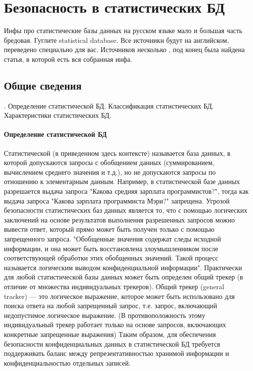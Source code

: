 \section{Безопасность в статистических БД}

Инфы про статистические базы данных на русском языке мало и большая часть бредовая. Гуглите statistical database. Все источники будут на английском, переведено специально для вас. Источников несколько \cite{ComputerSecurity2008} \cite{IntroBD2014}, под конец была найдена статья, \cite{SDB1989} в которой есть вся собранная инфа.

\subsection{Общие сведения}.
Определение статистической БД. Классификация статистических БД. Характеристики статистических БД.

\paragraph{Определение статистической БД}
Статистической (в приведенном здесь контексте) называется база данных, в которой допускаются запросы с обобщением данных (суммированием, вычислением среднего значения и т.д.), но не допускаются запросы по отношению к элементарным данным. Например, в статистической базе данных разрешается выдача запроса "Какова средняя зарплата программистов?", тогда как выдача запроса "Какова зарплата программиста Мэри?" запрещена.
Угрозой безопасности статистических баз данных является то, что с помощью логических заключений на основе результатов выполнения разрешенных запросов можно вывести ответ, который прямо может быть получен только с помощью запрещенного запроса. "Обобщенные значения содержат следы исходной информации, и она может быть восстановлена злоумышленником после соответствующей обработки этих обобщенных значений. Такой процесс называется логическим выводом конфиденциальной информации".
Практически для любой статистической базы данных может быть определен общий трекер (в отличие от множества индивидуальных трекеров). Общий трекер (general tracker) — это логическое выражение, которое может быть использовано для поиска ответа на любой запрещенный запрос, т.е. запрос, включающий недопустимое логическое выражение. (В противоположность этому индивидуальный трекер работает только на основе запросов, включающих конкретные запрещенные выражения)
Таким образом, для обеспечения безопасности конфиденциальных данных в статистической БД требуется поддерживать баланс между репрезентативностью хранимой информации и конфиденциальностью отдельных записей.

